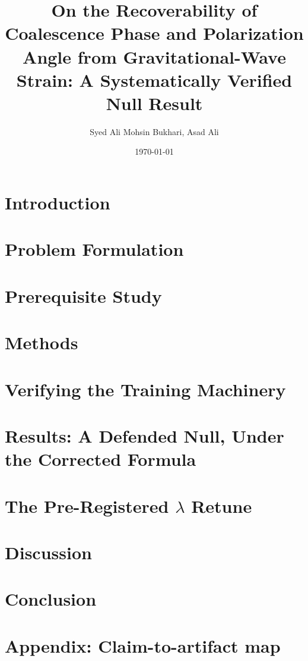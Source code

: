 \documentclass[journal]{IEEEtran}
\title{On the Recoverability of Coalescence Phase and Polarization Angle from Gravitational-Wave Strain: A Systematically Verified Null Result}
\author{Syed Ali Mohsin Bukhari, Asad Ali}
\date{\today}
\begin{document}
    \maketitle

%    

    \section{Introduction}
    \label{sec:phicpsi:intro}
    


    \section{Problem Formulation}
    \label{sec:phicpsi:problem}
    


    \section{Prerequisite Study}
    \label{sec:phicpsi:prereq}
    


    \section{Methods}
    \label{sec:phicpsi:methods}
    


    \section{Verifying the Training Machinery}
    \label{sec:phicpsi:arc}
    


    \section{Results: A Defended Null, Under the Corrected Formula}
    \label{sec:phicpsi:results}
    


    \section{The Pre-Registered $\lambda$ Retune}
    \label{sec:phicpsi:prereg}
    


    \section{Discussion}
    \label{sec:phicpsi:discussion}
    


    \section{Conclusion}
    \label{sec:phicpsi:conclusion}
    


    \section*{Appendix: Claim-to-artifact map}
    \label{sec:phicpsi:appendix}
    

    \clearpage

    
    
\end{document}
